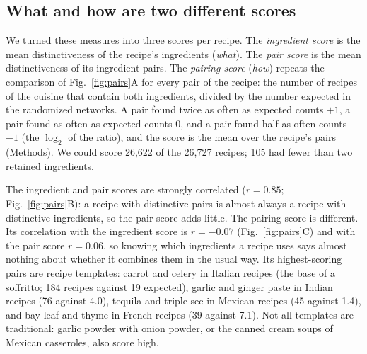 \subsection*{What and how are two different scores}
We turned these measures into three scores per recipe. The \emph{ingredient score} is the mean distinctiveness of the recipe's ingredients (\emph{what}). The \emph{pair score} is the mean distinctiveness of its ingredient pairs. The \emph{pairing score} (\emph{how}) repeats the comparison of Fig.~\ref{fig:pairs}A for every pair of the recipe: the number of recipes of the cuisine that contain both ingredients, divided by the number expected in the randomized networks. A pair found twice as often as expected counts $+1$, a pair found as often as expected counts 0, and a pair found half as often counts $-1$ (the $\log_2$ of the ratio), and the score is the mean over the recipe's pairs (Methods). We could score 26,622 of the 26,727 recipes; 105 had fewer than two retained ingredients.

The ingredient and pair scores are strongly correlated ($r=0.85$; Fig.~\ref{fig:pairs}B): a recipe with distinctive pairs is almost always a recipe with distinctive ingredients, so the pair score adds little. The pairing score is different. Its correlation with the ingredient score is $r=-0.07$ (Fig.~\ref{fig:pairs}C) and with the pair score $r=0.06$, so knowing which ingredients a recipe uses says almost nothing about whether it combines them in the usual way. Its highest-scoring pairs are recipe templates: carrot and celery in Italian recipes (the base of a soffritto; 184 recipes against 19 expected), garlic and ginger paste in Indian recipes (76 against 4.0), tequila and triple sec in Mexican recipes (45 against 1.4), and bay leaf and thyme in French recipes (39 against 7.1). Not all templates are traditional: garlic powder with onion powder, or the canned cream soups of Mexican casseroles, also score high.
